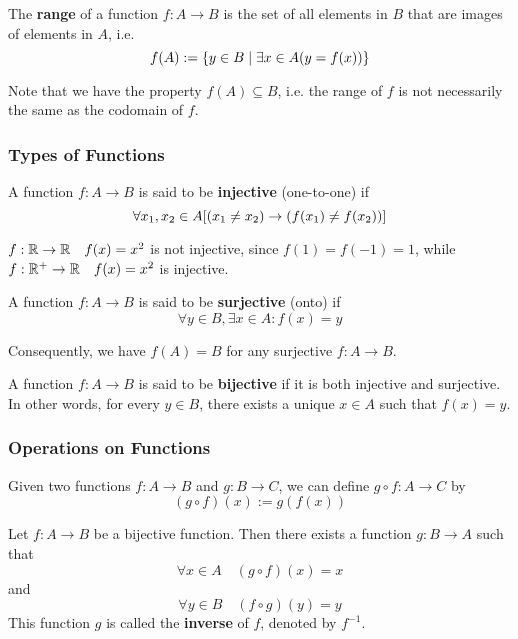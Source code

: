 \begin{definition}[Range]
    The \textbf{range} of a function $f:A\to B$ is the set of all elements in $B$ that
    are images of elements in $A$, i.e.
    \[
        f(A) := \{y\in B \mid \exists x\in A (y=f(x))\}
    \]

    Note that we have the property $f(A) \subseteq B$, i.e. the range of $f$ is not necessarily
    the same as the codomain of $f$.
\end{definition}

\subsubsection{Types of Functions}

\begin{definition}
    A function $f:A\to B$ is said to be \textbf{injective} (one-to-one) if
    \[
        \forall x_1, x_2 \in A [(x_1  \neq x_2) \rightarrow (f(x_1) \neq f(x_2))]
    \]
\end{definition}

\begin{example}
    $f:\mathbb{R}\to\mathbb{R}\quad f(x) = x^2$ is not injective, since $f(1) = f(-1) = 1$,
    while $f:\mathbb{R}^+\to\mathbb{R}\quad f(x) = x^2$ is injective.
\end{example}

\begin{definition}
    A function $f:A\to B$ is said to be \textbf{surjective} (onto) if
    \[
        \forall y \in B, \exists x \in A : f(x) = y
    \]

    Consequently, we have $f(A) = B$ for any surjective $f:A\to B$.
\end{definition}

\begin{definition}
    A function $f:A\to B$ is said to be \textbf{bijective} if it is both injective and surjective.
    In other words, for every $y \in B$, there exists a unique $x \in A$ such that $f(x) = y$.
\end{definition}

\subsubsection{Operations on Functions}

\begin{definition}
    Given two functions $f:A\to B$ and $g:B\to C$, we can define $g\circ f:A\to C$ by
    \[
        (g\circ f)(x) := g(f(x))
    \]
\end{definition}

\begin{definition}
    Let $f:A\to B$ be a bijective function. Then there exists a function $g:B\to A$ such that
    \[
        \forall x \in A \quad (g\circ f)(x) = x
    \]
    and
    \[
        \forall y \in B \quad (f\circ g)(y) = y
    \]
    This function $g$ is called the \textbf{inverse} of $f$, denoted by $f^{-1}$.
\end{definition}